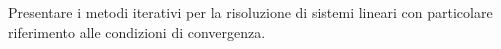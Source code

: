 Presentare i metodi iterativi per la risoluzione di sistemi lineari con particolare riferimento alle condizioni di convergenza. 